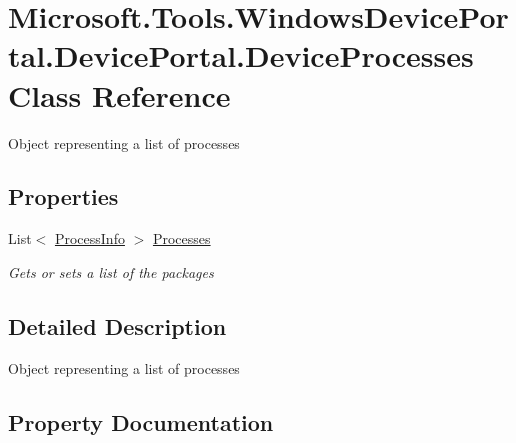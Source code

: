\hypertarget{class_microsoft_1_1_tools_1_1_windows_device_portal_1_1_device_portal_1_1_device_processes}{}\section{Microsoft.\+Tools.\+Windows\+Device\+Portal.\+Device\+Portal.\+Device\+Processes Class Reference}
\label{class_microsoft_1_1_tools_1_1_windows_device_portal_1_1_device_portal_1_1_device_processes}


Object representing a list of processes  


\subsection*{Properties}
\begin{DoxyCompactItemize}
\item 
List$<$ \hyperlink{class_microsoft_1_1_tools_1_1_windows_device_portal_1_1_device_portal_1_1_process_info}{Process\+Info} $>$ \hyperlink{class_microsoft_1_1_tools_1_1_windows_device_portal_1_1_device_portal_1_1_device_processes_a70435ee2dab80a20369db88c9c218cae}{Processes}
\begin{DoxyCompactList}\small\item\em Gets or sets a list of the packages \end{DoxyCompactList}\end{DoxyCompactItemize}


\subsection{Detailed Description}
Object representing a list of processes 



\subsection{Property Documentation}
